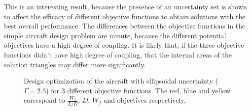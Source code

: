 This is an interesting result, because the presence of an uncertainty set is
shown to affect the efficacy of different objective functions to obtain solutions
with the best overall performance. The differences between the objective functions
in the simple aircraft design problem are minute, because the different potential objectives
have a high degree of coupling. It is likely that, if the three objective functions didn't
have high degree of coupling, that the internal areas of the solution triangles may differ
more significantly.

\begin{figure}[H]
\caption{Design optimization of the aircraft with ellipsoidal uncertainty ($\Gamma = 2.5$) for 3 different objective functions.
The red, blue and yellow correspond to $\frac{W_f}{L/D}$, $D$, $W_f$ and objectives respectively.}
\begin{center}
\end{center}
\end{figure}
